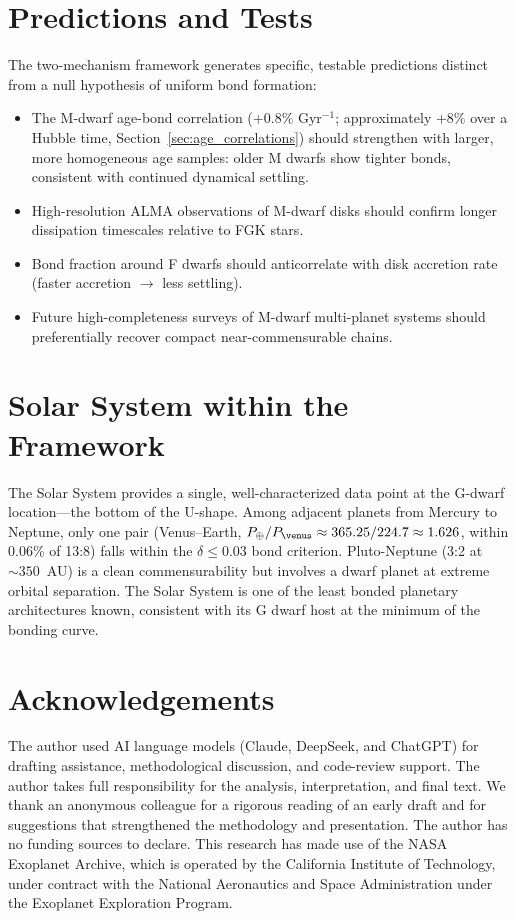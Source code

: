 \documentclass[twocolumn,usenatbib]{mnras}
\begin{document}
\section{Predictions and Tests}

The two-mechanism framework generates specific, testable predictions distinct
from a null hypothesis of uniform bond formation:
\begin{itemize}
  \item The M-dwarf age-bond correlation ($+0.8\%$ Gyr$^{-1}$; approximately
        $+8\%$ over a Hubble time,
        Section~\ref{sec:age_correlations}) should strengthen with larger, more
        homogeneous age samples: older M dwarfs show tighter bonds, consistent
        with continued dynamical settling.
  \item High-resolution ALMA observations of M-dwarf disks should confirm
        longer dissipation timescales relative to FGK stars.
  \item Bond fraction around F dwarfs should anticorrelate with disk accretion
        rate (faster accretion $\rightarrow$ less settling).
  \item Future high-completeness surveys of M-dwarf multi-planet systems should
        preferentially recover compact near-commensurable chains.
\end{itemize}

\section{Solar System within the Framework}

The Solar System provides a single, well-characterized data point at the
G-dwarf location---the bottom of the U-shape. Among adjacent planets from
Mercury to Neptune, only one pair (Venus--Earth, $P_\oplus/P_\venus \approx
365.25/224.7 \approx 1.626$, within 0.06\% of 13:8) falls
within the $\delta \leq 0.03$ bond criterion. Pluto-Neptune (3:2 at $\sim
350$~AU) is a clean commensurability but involves a dwarf planet at extreme
orbital separation. The Solar System is one of the least bonded planetary
architectures known, consistent with its G dwarf host at the minimum of the
bonding curve.

\section{Acknowledgements}

The author used AI language models (Claude, DeepSeek, and ChatGPT) for
drafting assistance, methodological discussion, and code-review support.
The author takes full responsibility for the analysis, interpretation, and
final text. We thank an anonymous colleague for a rigorous reading of an early
draft and for suggestions that strengthened the methodology and presentation.
The author has no funding sources to declare. This research has made use of
the NASA Exoplanet Archive, which is operated by the California Institute of
Technology, under contract with the National Aeronautics and Space
Administration under the Exoplanet Exploration Program.
\end{document}
